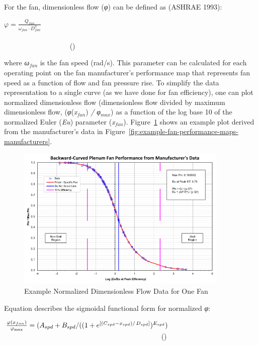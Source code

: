 For the fan, dimensionless flow (\emph{φ}) can be defined as (ASHRAE 1993):

\(\varphi = \frac{{{Q_{fan}}}}{{{\omega_{fan}} \cdot D_{fan}^3}}\) ~~~~~~~~~~~~~~~~~~~~~~~~~~~~~~~~~~~~~~~~~~~~~~~~~~~~~~~~~~~~~~~~~~~~~~~~~~~~~~~~~~~~~~~~~~ ()

where \emph{ω\(_{fan}\)} is the fan speed (rad/s). This parameter can be calculated for each operating point on the fan manufacturer's performance map that represents fan speed as a function of flow and fan pressure rise. To simplify the data representation to a single curve (as we have done for fan efficiency), one can plot normalized dimensionless flow (dimensionless flow divided by maximum dimensionless flow, (\emph{φ}(\emph{x\(_{fan}\)}) \emph{/} \emph{φ\(_{max}\)}) as a function of the log base 10 of the normalized Euler (\emph{Eu}) parameter (\emph{x\(_{fan}\)}). Figure~\ref{fig:example-normalized-dimensionless-flow-data} shows an example plot derived from the manufacturer's data in Figure~\ref{fig:example-fan-performance-maps-manufacturers}.

\begin{figure}[hbtp] %
\centering
\includegraphics[width=0.9\textwidth, height=0.9\textheight, keepaspectratio=true]{media/image4901.svg.png}
\caption{Example Normalized Dimensionless Flow Data for One Fan \protect \label{fig:example-normalized-dimensionless-flow-data}}
\end{figure}

Equation describes the sigmoidal functional form for normalized \emph{φ}:

\(\frac{{\varphi \left( {{x_{fan}}} \right)}}{{{\varphi_{\max }}}} = ({A_{spd}} + {B_{spd}}/({(1 + {e^{\left[ {{{({C_{spd}} - {x_{spd}})} \mathord{\left/ {\vphantom {{({C_{spd}} - {x_{spd}})} {{D_{spd}}}}} \right. } {{D_{spd}}}}} \right]}})^{{E_{spd}}}})\) ~~~~~~~~~~~~~~~~~~~~~~~~~~~~~~~~~~~~~~~~~~~~ ()


